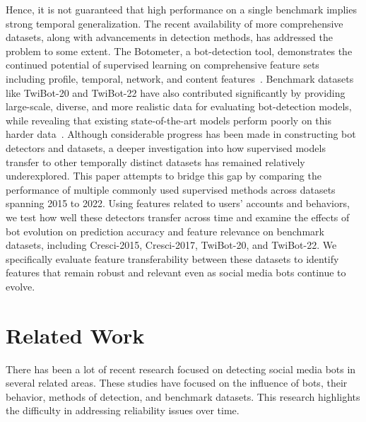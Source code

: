 Hence, it is not guaranteed that high performance on a single benchmark implies strong temporal generalization. The recent availability of more comprehensive datasets, along with advancements in detection methods, has addressed the problem to some extent. The Botometer, a bot-detection tool, demonstrates the continued potential of supervised learning on comprehensive feature sets including profile, temporal, network, and content features~\cite{yang2022botometer}. Benchmark datasets like TwiBot-20 and TwiBot-22 have also contributed significantly by providing large-scale, diverse, and more realistic data for evaluating bot-detection models, while revealing that existing state-of-the-art models perform poorly on this harder data~\cite{feng2021twibot20, feng2022twibot22}. Although considerable progress has been made in constructing bot detectors and datasets, a deeper investigation into how supervised models transfer to other temporally distinct datasets has remained relatively underexplored. This paper attempts to bridge this gap by comparing the performance of multiple commonly used supervised methods across datasets spanning 2015 to 2022. Using features related to users' accounts and behaviors, we test how well these detectors transfer across time and examine the effects of bot evolution on prediction accuracy and feature relevance on benchmark datasets, including Cresci-2015, Cresci-2017, TwiBot-20, and TwiBot-22. We specifically evaluate feature transferability between these datasets to identify features that remain robust and relevant even as social media bots continue to evolve.

\section{Related Work}\label{sec:related}
There has been a lot of recent research focused on detecting social media bots in several related areas. These studies have focused on the influence of bots, their behavior, methods of detection, and benchmark datasets. This research highlights the difficulty in addressing reliability issues over time.

